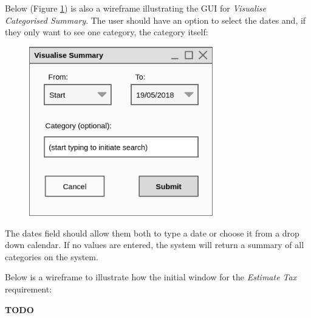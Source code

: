 Below (Figure \ref{fig:Wireframe.VisualiseCategorisedSummary}) is also a
wireframe illustrating the GUI for \emph{Visualise Categorised Summary}. The
user should have an option to select the dates and, if they only want to see
one category, the category itself:
\begin{figure}[ht!]
  \begin{center}
    \includegraphics[width=8cm]{./contents/img/Wireframe_-_Visualise_Summary.png}
  \end{center}
  \caption{}
  \label{fig:Wireframe.VisualiseCategorisedSummary}
\end{figure}
\FloatBarrier

The dates field should allow them both to type a date or choose it from a drop
down calendar. If no values are entered, the system will return a summary of
all categories on the system.



Below is a wireframe to illustrate how the initial window for the
\emph{Estimate Tax} requirement:

\textbf{TODO}

